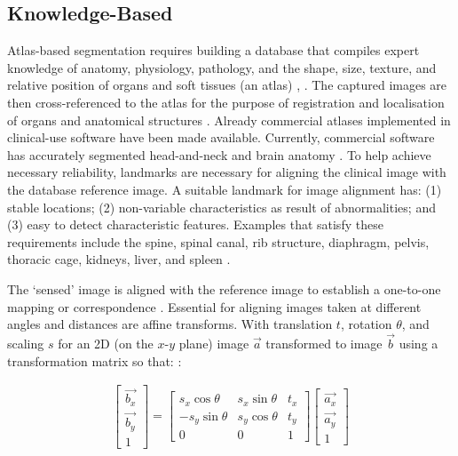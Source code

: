 \documentclass{bmcart}
\begin{document}
\subsection*{Knowledge-Based}
Atlas-based segmentation requires building a database that compiles expert knowledge of anatomy, physiology, pathology, and the shape, size, texture, and relative position of organs and soft tissues (an atlas) \cite{banik_landmarking_2009}, \cite{sharma_automated_2010}. The captured images are then cross-referenced to the atlas for the purpose of registration and localisation of organs and anatomical structures \cite{banik_landmarking_2009}. Already commercial atlases implemented in clinical-use software have been made available. Currently, commercial software has accurately segmented head-and-neck and brain anatomy \cite{brock_image_2014}. To help achieve necessary reliability, landmarks are necessary for aligning the clinical image with the database reference image. A suitable landmark for image alignment has: (1) stable locations; (2) non-variable characteristics as result of abnormalities; and (3) easy to detect characteristic features. Examples that satisfy these requirements include the spine, spinal canal, rib structure, diaphragm, pelvis, thoracic cage, kidneys, liver, and spleen \cite{banik_landmarking_2009}.
\par The `sensed' image is aligned with the reference image to establish a one-to-one mapping or correspondence \cite{pham_current_2000}. Essential for aligning images taken at different angles and distances are affine transforms. With translation $t$, rotation $\theta$, and scaling $s$ for an 2D (on the $x$-$y$ plane) image $\vec{a}$ transformed to image $\vec{b}$ using a transformation matrix so that: \cite{zitova_image_2003}:
\begin{ceqn}
\begin{align}
    \begin{bmatrix}
    \vec{b_x} \\
    \vec{b_y} \\
    1
    \end{bmatrix}
    = \begin{bmatrix}
         s_x \cos \theta & s_x \sin \theta & t_x  \\
         -s_y \sin \theta & s_y \cos \theta & t_y \\
         0 & 0 & 1 
    \end{bmatrix}
    \begin{bmatrix}
    \vec{a_x} \\
    \vec{a_y} \\
    1
    \end{bmatrix}
\end{align}
\end{ceqn}
\end{document}
